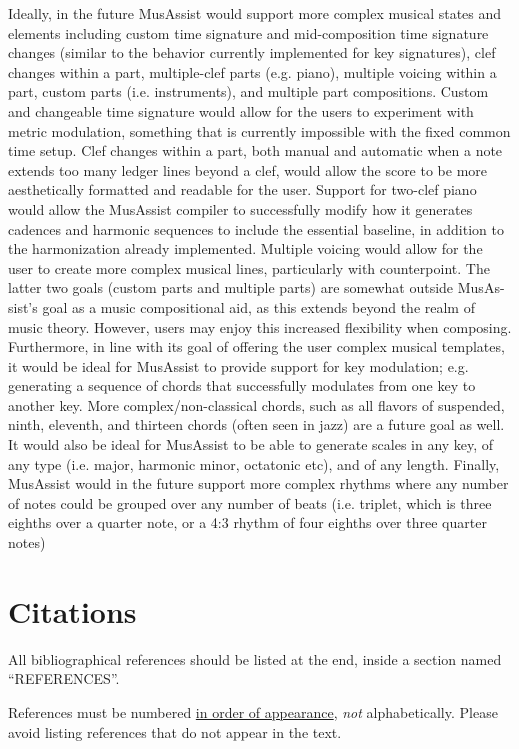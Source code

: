 \documentclass{article}
\begin{document}
Ideally, in the future MusAssist would support more complex musical states and elements including
custom time signature and mid-composition time signature changes (similar to the behavior
currently implemented for key signatures), clef changes within a part, multiple-clef parts (e.g.
piano), multiple voicing within a part, custom parts (i.e. instruments), and multiple part compositions.
Custom and changeable time signature would allow for the users to experiment with metric modulation,
something that is currently impossible with the fixed common time setup. Clef changes within a
part, both manual and automatic when a note extends too many ledger lines beyond a clef, would
allow the score to be more aesthetically formatted and readable for the user. Support for two-clef piano
would allow the MusAssist compiler to successfully modify how it generates cadences and harmonic
sequences to include the essential baseline, in addition to the harmonization already implemented.
Multiple voicing would allow for the user to create more complex musical lines, particularly with
counterpoint. The latter two goals (custom parts and multiple parts) are somewhat outside MusAs-
sist’s goal as a music compositional aid, as this extends beyond the realm of music theory. However,
users may enjoy this increased flexibility when composing. Furthermore, in line with its goal of
offering the user complex musical templates, it would be ideal for MusAssist to provide support for
key modulation; e.g. generating a sequence of chords that successfully modulates from one key to
another key. More complex/non-classical chords, such as all flavors of suspended, ninth, eleventh,
and thirteen chords (often seen in jazz) are a future goal as well. It would also be ideal for MusAssist
to be able to generate scales in any key, of any type (i.e. major, harmonic minor, octatonic etc),
and of any length. Finally, MusAssist would in the future support more complex rhythms where
any number of notes could be grouped over any number of beats (i.e. triplet, which is three eighths
over a quarter note, or a 4:3 rhythm of four eighths over three quarter notes)





\section{Citations}
All bibliographical references should be listed at the end, inside a section named ``REFERENCES''.

References must be numbered {\ul {in order of appearance}}, {\em not} alphabetically. Please avoid listing references that do not appear in the text.
\end{document}

